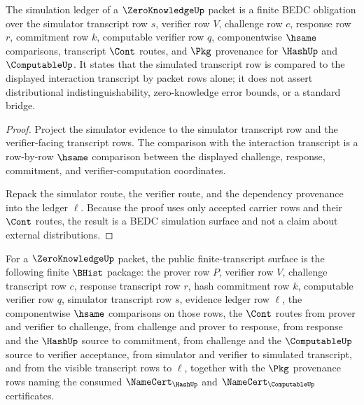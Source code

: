 \begin{theorem}
\label{thm:zeroknowledge-simulation-ledger-obligation}
The simulation ledger of a $\ZeroKnowledgeUp$ packet is a finite BEDC obligation over the simulator transcript row $s$, verifier row $V$, challenge row $c$, response row $r$, commitment row $k$, computable verifier row $q$, componentwise $\hsame$ comparisons, transcript $\Cont$ routes, and $\Pkg$ provenance for $\HashUp$ and $\ComputableUp$. It states that the simulated transcript row is compared to the displayed interaction transcript by packet rows alone; it does not assert distributional indistinguishability, zero-knowledge error bounds, or a standard bridge.
\end{theorem}
\begin{proof}
Project the simulator evidence to the simulator transcript row and the verifier-facing transcript rows. The comparison with the interaction transcript is a row-by-row $\hsame$ comparison between the displayed challenge, response, commitment, and verifier-computation coordinates.

Repack the simulator route, the verifier route, and the dependency provenance into the ledger $\ell$. Because the proof uses only accepted carrier rows and their $\Cont$ routes, the result is a BEDC simulation surface and not a claim about external distributions.
\end{proof}

\begin{definition}
\label{def:zeroknowledge-public-finite-transcript-surface}
For a $\ZeroKnowledgeUp$ packet, the public finite-transcript surface is the following finite $\BHist$ package: the prover row $P$, verifier row $V$, challenge transcript row $c$, response transcript row $r$, hash commitment row $k$, computable verifier row $q$, simulator transcript row $s$, evidence ledger row $\ell$, the componentwise $\hsame$ comparisons on those rows, the $\Cont$ routes from prover and verifier to challenge, from challenge and prover to response, from response and the $\HashUp$ source to commitment, from challenge and the $\ComputableUp$ source to verifier acceptance, from simulator and verifier to simulated transcript, and from the visible transcript rows to $\ell$, together with the $\Pkg$ provenance rows naming the consumed $\NameCert_{\HashUp}$ and $\NameCert_{\ComputableUp}$ certificates.
\end{definition}

